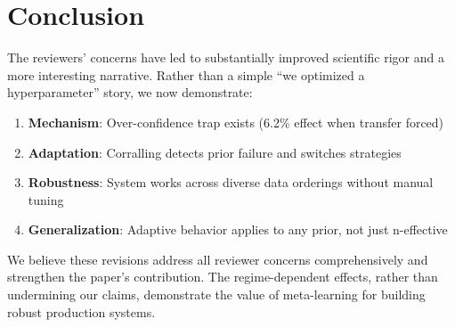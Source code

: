 \section*{Conclusion}

The reviewers' concerns have led to substantially improved scientific rigor and a more interesting narrative. Rather than a simple ``we optimized a hyperparameter'' story, we now demonstrate:

\begin{enumerate}[leftmargin=*, itemsep=2pt]
    \item \textbf{Mechanism}: Over-confidence trap exists (6.2\% effect when transfer forced)
    \item \textbf{Adaptation}: Corralling detects prior failure and switches strategies
    \item \textbf{Robustness}: System works across diverse data orderings without manual tuning
    \item \textbf{Generalization}: Adaptive behavior applies to any prior, not just n-effective
\end{enumerate}

We believe these revisions address all reviewer concerns comprehensively and strengthen the paper's contribution. The regime-dependent effects, rather than undermining our claims, demonstrate the value of meta-learning for building robust production systems.

